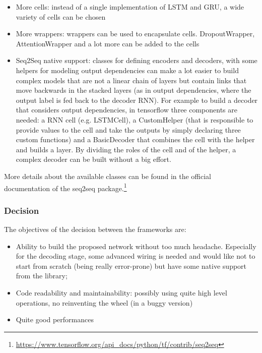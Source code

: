 \begin{itemize}
	\item More cells: instead of a single implementation of LSTM and GRU, a wide variety of cells can be chosen

	\item More wrappers: wrappers can be used to encapsulate cells. DropoutWrapper, AttentionWrapper and a lot more can be added to the cells

	\item Seq2Seq native support: classes for defining encoders and decoders, with some helpers for modeling output dependencies can make a lot easier to build complex models that are not a linear chain of layers but contain links that move backwards in the stacked layers (as in output dependencies, where the output label is fed back to the decoder RNN). For example to build a decoder that considers output dependencies, in tensorflow three components are needed: a RNN cell (e.g. LSTMCell), a CustomHelper (that is responsible to provide values to the cell and take the outputs by simply declaring three custom functions) and a BasicDecoder that combines the cell with the helper and builds a layer. By dividing the roles of the cell and of the helper, a complex decoder can be built without a big effort.
\end{itemize}

More details about the available classes can be found in the official documentation of the seq2seq package.\footnote{\url{https://www.tensorflow.org/api\_docs/python/tf/contrib/seq2seq}}

\subsubsection{Decision}
The objectives of the decision between the frameworks are:

\begin{itemize}
	\item Ability to build the proposed network without too much headache. Especially for the decoding stage, some advanced wiring is needed and would like not to start from scratch (being really error-prone) but have some native support from the library;

	\item Code readability and maintainability: possibly using quite high level operations, no reinventing the wheel (in a buggy version)

	\item Quite good performances
\end{itemize}

